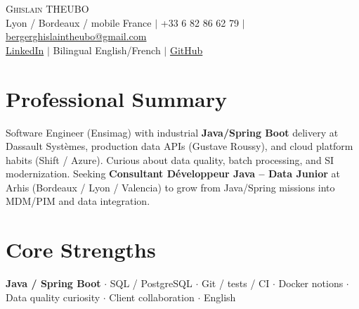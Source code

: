 \documentclass[letterpaper,10.5pt]{article}
\begin{document}
\begin{center}
{\Huge \scshape Ghislain THEUBO} \\ \vspace{2pt}
\small Lyon / Bordeaux / mobile France $|$ +33 6 82 86 62 79 $|$ \href{mailto:bergerghislaintheubo@gmail.com}{bergerghislaintheubo@gmail.com} \\
\href{https://www.linkedin.com/in/berger-ghislain}{LinkedIn} $|$ Bilingual English/French $|$ \href{https://github.com/Bergerghislain}{GitHub}
\end{center}
\vspace{-6pt}
\section{Professional Summary}
\small{Software Engineer (Ensimag) with industrial \textbf{Java/Spring Boot} delivery at Dassault Syst\`emes, production data APIs (Gustave Roussy), and cloud platform habits (Shift / Azure). Curious about data quality, batch processing, and SI modernization. Seeking \textbf{Consultant D\'eveloppeur Java -- Data Junior} at Arhis (Bordeaux / Lyon / Valencia) to grow from Java/Spring missions into MDM/PIM and data integration.}
\section{Core Strengths}
\small{\textbf{Java / Spring Boot} $\cdot$ SQL / PostgreSQL $\cdot$ Git / tests / CI $\cdot$ Docker notions $\cdot$ Data quality curiosity $\cdot$ Client collaboration $\cdot$ English}
\end{document}
